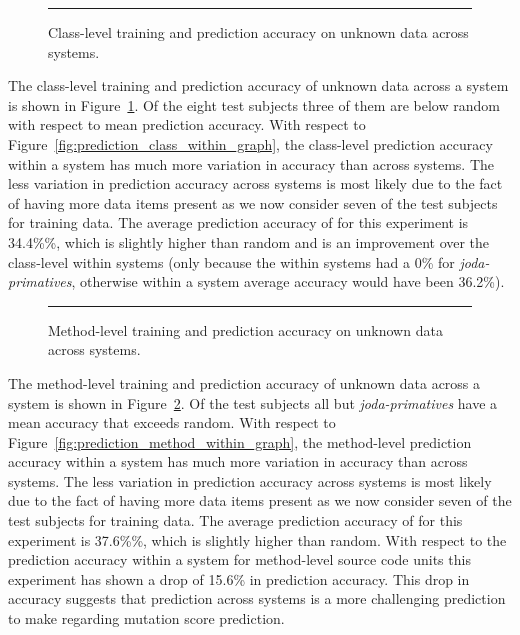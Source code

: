 \begin{figure}[!tb]
  \centering
  \begin{adjustbox}{max size={\textwidth}{\textheight}}
    
  \end{adjustbox}
  \caption{Class-level training and prediction accuracy on unknown data across systems.}
  \vspace{2mm}
  \hrule
  \label{fig:prediction_class_across_graph}
\end{figure}


The class-level training and prediction accuracy of unknown data across a system is shown in Figure~\ref{fig:prediction_class_across_graph}. Of the eight test subjects three of them are below random with respect to mean prediction accuracy. With respect to Figure~\ref{fig:prediction_class_within_graph}, the class-level prediction accuracy within a system has much more variation in accuracy than across systems. The less variation in prediction accuracy across systems is most likely due to the fact of having more data items present as we now consider seven of the test subjects for training data. The average prediction accuracy of for this experiment is 34.4\%\%, which is slightly higher than random and is an improvement over the class-level within systems (only because the within systems had a 0\% for \textit{joda-primatives}, otherwise within a system average accuracy would have been 36.2\%).

\begin{figure}[!tb]
  \centering
  \begin{adjustbox}{max size={\textwidth}{\textheight}}
    
  \end{adjustbox}
  \caption{Method-level training and prediction accuracy on unknown data across systems.}
  \vspace{2mm}
  \hrule
  \label{fig:prediction_method_across_graph}
\end{figure}

The method-level training and prediction accuracy of unknown data across a system is shown in Figure~\ref{fig:prediction_method_across_graph}. Of the test subjects all but \textit{joda-primatives} have a mean accuracy that exceeds random. With respect to Figure~\ref{fig:prediction_method_within_graph}, the method-level prediction accuracy within a system has much more variation in accuracy than across systems. The less variation in prediction accuracy across systems is most likely due to the fact of having more data items present as we now consider seven of the test subjects for training data. The average prediction accuracy of for this experiment is 37.6\%\%, which is slightly higher than random. With respect to the prediction accuracy within a system for method-level source code units this experiment has shown a drop of 15.6\% in prediction accuracy. This drop in accuracy suggests that prediction across systems is a more challenging prediction to make regarding mutation score prediction.


